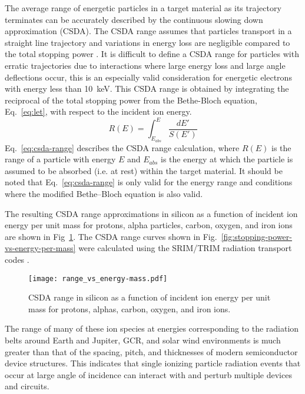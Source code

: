 The average range of energetic particles in a target material as its trajectory terminates can be accurately described by the continuous slowing down approximation (CSDA). 
The CSDA range assumes that particles transport in a straight line trajectory and variations in energy loss are negligible compared to the total stopping power \cite{bichsel1988straggling}.
It is difficult to define a CSDA range for particles with erratic trajectories due to interactions where large energy loss and large angle deflections occur, this is an especially valid consideration for energetic electrons with energy less than 10~keV.
This CSDA range is obtained by integrating the reciprocal of the total stopping power from the Bethe-Bloch equation, Eq.~\ref{eq:let}, with respect to the incident ion energy.
\begin{equation}
    \label{eq:csda-range}
    R(E) = \int_{E_{abs}}^E \frac{dE'}{S(E')}
\end{equation}
Eq.~\ref{eq:csda-range} describes the CSDA range calculation, where $R(E)$ is the range of a particle with energy $E$ and $E_{abs}$ is the energy at which the particle is assumed to be absorbed (i.e. at rest) within the target material.
It should be noted that Eq.~\ref{eq:csda-range} is only valid for the energy range and conditions where the modified Bethe--Bloch equation is also valid.

The resulting CSDA range approximations in silicon as a function of incident ion energy per unit mass for protons, alpha particles, carbon, oxygen, and iron ions are shown in Fig~\ref{fig:range-vs-energy-per-mass}.
The CSDA range curves shown in Fig.~\ref{fig:stopping-power-vs-energy-per-mass} were calculated using the SRIM/TRIM radiation transport codes \cite{ziegler2010srim}.
\begin{figure}[tb]
    \begin{center}
        \texttt{[image: range\_vs\_energy-mass.pdf]}
    \end{center}
    \caption{CSDA range in silicon as a function of incident ion energy per unit mass for protons, alphas, carbon, oxygen, and iron ions.}
    \label{fig:range-vs-energy-per-mass}
\end{figure}

The range of many of these ion species at energies corresponding to the radiation belts around Earth and Jupiter, GCR, and solar wind environments is much greater than that of the spacing, pitch, and thicknesses of modern semiconductor device structures.
This indicates that single ionizing particle radiation events that occur at large angle of incidence can interact with and perturb multiple devices and circuits.

